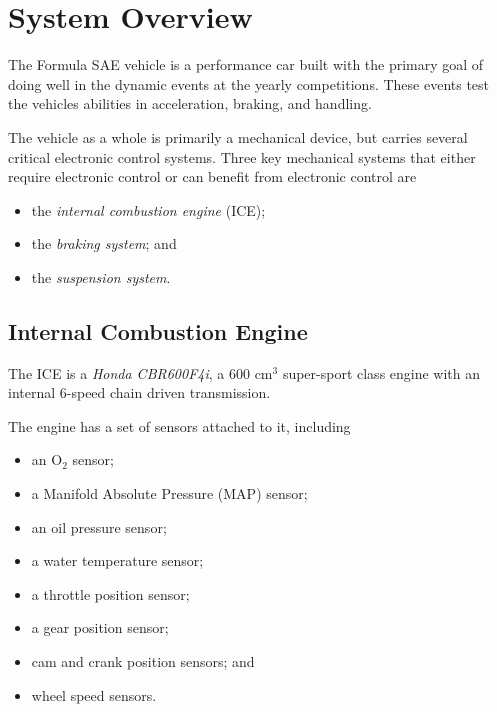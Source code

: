 %
%
%
%

\section{System Overview}

The Formula SAE vehicle is a performance car built with the primary goal of doing well in the 
dynamic events at the yearly competitions. These events test the vehicles abilities in acceleration, 
braking, and handling.

The vehicle as a whole is primarily a mechanical device, but carries several critical electronic 
control systems. Three key mechanical systems that either require electronic control or can benefit 
from electronic control are

\begin{itemize}
\item the \emph{internal combustion engine} (ICE); 
\item the \emph{braking system}; and
\item the \emph{suspension system}.
\end{itemize}

\subsection{Internal Combustion Engine}

The ICE is a \emph{Honda CBR600F4i}, a 600 cm$^3$ super-sport class engine with an internal 6-speed 
chain driven transmission. 

The engine has a set of sensors attached to it, including

\begin{itemize}
\item an O$_{2}$ sensor;
\item a Manifold Absolute Pressure (MAP) sensor; 
\item an oil pressure sensor;
\item a water temperature sensor;
\item a throttle position sensor;
\item a gear position sensor;
\item cam and crank position sensors; and
\item wheel speed sensors.
\end{itemize}

